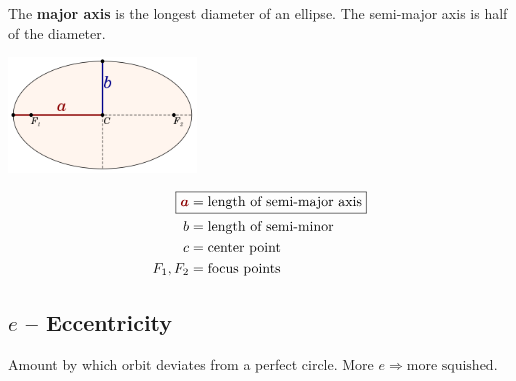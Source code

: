 \documentclass{article}
\begin{document}
The \textbf{major axis} is the longest diameter of an ellipse. The semi-major axis is half of the diameter.

\bigskip

\begin{minipage}{0.45\textwidth}
    \centering
    \includegraphics[width=5cm]{img/semimajor.png}
\end{minipage}\hfill
\begin{minipage}{0.45\textwidth}
    \centering
    \begin{align*}
        \Aboxed{\textcolor{DarkRed}{\bm{a}} &= \text{length of semi-major axis}} \\
        b &= \text{length of semi-minor} \\
        c &= \text{center point} \\
        F_1, F_2 &= \text{focus points}
    \end{align*}
\end{minipage}

\subsection{$e$ -- Eccentricity}
\label{sec:eccentricity}

Amount by which orbit deviates from a perfect circle. More $e \Rightarrow \text{more squished}$.
\end{document}
